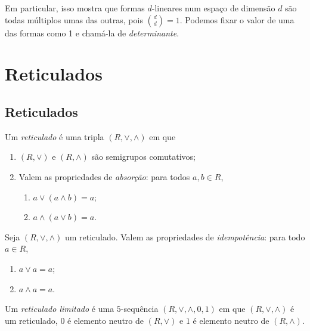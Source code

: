 Em particular, isso mostra que formas $d$-lineares num espaço de dimensão $d$ são todas múltiplos umas das outras, pois $\binom{d}{d}=1$. Podemos fixar o valor de uma das formas como 1 e chamá-la de \emph{determinante}.

















\chapter{Reticulados}

\section{Reticulados}

\begin{defi}
Um \emph{reticulado} é uma tripla $(R,\vee,\wedge)$ em que
	\begin{enumerate}
	\item $(R,\vee)$ e $(R,\wedge)$ são semigrupos comutativos;
	\item Valem as propriedades de \emph{absorção}: para todos $a,b \in R$, 
		\begin{enumerate}
		\item $a \vee (a \wedge b) = a$;
		\item $a \wedge (a \vee b) = a$.
		\end{enumerate}
	\end{enumerate}
\end{defi}

\begin{prop}
Seja $(R,\vee,\wedge)$ um reticulado. Valem as propriedades de \emph{idempotência}: para todo $a \in R$,
	\begin{enumerate}
	\item $a \vee a = a$;
	\item $a \wedge a = a$.
	\end{enumerate}
\end{prop}

\begin{defi}
Um \emph{reticulado limitado} é uma $5$-sequência $(R,\vee,\wedge,0,1)$ em que $(R,\vee,\wedge)$ é um reticulado, $0$ é elemento neutro de $(R,\vee)$ e $1$ é elemento neutro de $(R,\wedge)$.
\end{defi}


